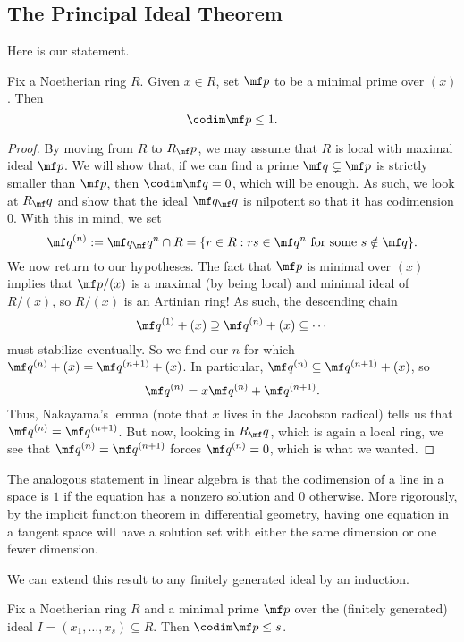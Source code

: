 \subsection{The Principal Ideal Theorem}
Here is our statement.
\begin{theorem}
	Fix a Noetherian ring $R$. Given $x\in R$, set $\mf p$ to be a minimal prime over $(x)$. Then
	\[\codim\mf p\le1.\]
\end{theorem}
\begin{proof}
	By moving from $R$ to $R_\mf p$, we may assume that $R$ is local with maximal ideal $\mf p$. We will show that, if we can find a prime $\mf q\subsetneq\mf p$ is strictly smaller than $\mf p$, then $\codim\mf q=0$, which will be enough. As such, we look at $R_\mf q$ and show that the ideal $\mf q_\mf q$ is nilpotent so that it has codimension $0$. With this in mind, we set
	\[\mf q^{(n)}:=\mf q_\mf q^n\cap R=\{r\in R:rs\in\mf q^n\text{ for some }s\notin\mf q\}.\]
	We now return to our hypotheses. The fact that $\mf p$ is minimal over $(x)$ implies that $\mf p/(x)$ is a maximal (by being local) and minimal ideal of $R/(x)$, %
	so $R/(x)$ is an Artinian ring! As such, the descending chain
	\[\mf q^{(1)}+(x)\supseteq\mf q^{(n)}+(x)\subseteq\cdots\]
	must stabilize eventually. So we find our $n$ for which $\mf q^{(n)}+(x)=\mf q^{(n+1)}+(x)$. In particular, $\mf q^{(n)}\subseteq\mf q^{(n+1)}+(x)$, so
	\[\mf q^{(n)}=x\mf q^{(n)}+\mf q^{(n+1)}.\]
	Thus, Nakayama's lemma (note that $x$ lives in the Jacobson radical) tells us that $\mf q^{(n)}=\mf q^{(n+1)}$. But now, looking in $R_\mf q$, which is again a local ring, we see that $\mf q^{(n)}=\mf q^{(n+1)}$ forces $\mf q^{(n)}=0$, which is what we wanted.
\end{proof}
\begin{remark}
	The analogous statement in linear algebra is that the codimension of a line in a space is $1$ if the equation has a nonzero solution and $0$ otherwise. More rigorously, by the implicit function theorem in differential geometry, having one equation in a tangent space will have a solution set with either the same dimension or one fewer dimension.
\end{remark}
We can extend this result to any finitely generated ideal by an induction.
\begin{theorem}
	Fix a Noetherian ring $R$ and a minimal prime $\mf p$ over the (finitely generated) ideal $I=(x_1,\ldots,x_s)\subseteq R$. Then $\codim\mf p\le s$.
\end{theorem}

